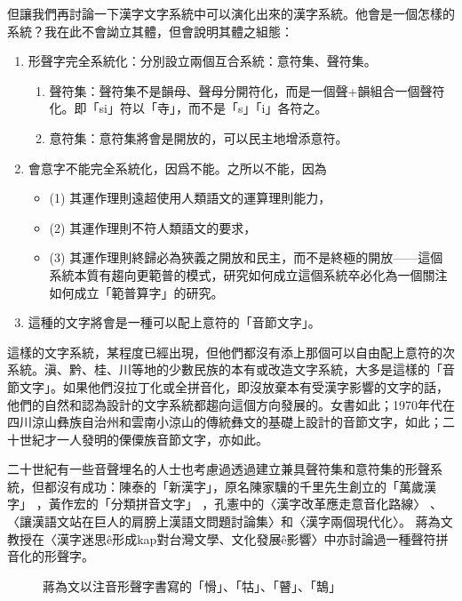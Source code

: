 \documentclass[a5paper, 12pt, openany]{book} %
\begin{document}
但讓我們再討論一下漢字文字系統中可以演化出來的漢字系統。他會是一個怎樣的系統？我在此不會詏立其體，但會說明其體之組態：

\begin{enumerate}
\item 形聲字完全系統化：分別設立兩個互合系統：意符集、聲符集。
\begin{enumerate}
	\item 聲符集：聲符集不是韻母、聲母分開符化，而是一個聲+韻組合一個聲符化。即「si」符以「寺」，而不是「s」「i」各符之。
	\item 意符集：意符集將會是開放的，可以民主地增添意符。
\end{enumerate}

\item 會意字不能完全系統化，因爲不能。之所以不能，因為
\begin{itemize}
	\item (1) 其運作理則遠超使用人類語文的運算理則能力，
	\item (2) 其運作理則不符人類語文的要求，
	\item (3) 其運作理則終歸必為狹義之開放和民主，而不是終極的開放——這個系統本質有趨向更範普的模式，研究如何成立這個系統卒必化為一個關注如何成立「範普算字」的研究。
\end{itemize}

\item 這種的文字將會是一種可以配上意符的「音節文字」。
\end{enumerate}


這樣的文字系統，某程度已經出現，但他們都沒有添上那個可以自由配上意符的次系統。滇、黔、桂、川等地的少數民族的本有或改造文字系統，大多是這樣的「音節文字」。如果他們沒拉丁化或全拼音化，即沒放棄本有受漢字影響的文字的話，他們的自然和認為設計的文字系統都趨向這個方向發展的。女書如此；1970年代在四川涼山彝族自治州和雲南小涼山的傳統彝文的基礎上設計的音節文字，如此；二十世紀才一人發明的傈僳族音節文字，亦如此。 

二十世紀有一些音聲埋名的人士也考慮過透過建立兼具聲符集和意符集的形聲系統，但都沒有成功：陳泰的「新漢字」，原名陳家驥的千里先生創立的「萬歲漢字」 ，黃作宏的「分類拼音文字」 ，孔憲中的〈漢字改革應走意音化路線〉 、〈讓漢語文站在巨人的肩膀上漢語文問題討論集〉和〈漢字兩個現代化〉。 蔣為文教授在〈漢字迷思ê形成kap對台灣文學、文化發展ê影響〉中亦討論過一種聲符拼音化的形聲字。 


\begin{figure}[H]
\centering
\caption{蔣為文以注音形聲字書寫的「愲」、「牯」、「瞽」、「鵠」}
\end{figure}
\end{document}
